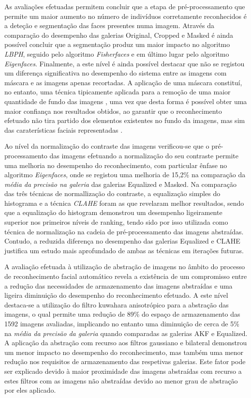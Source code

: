 As avaliações efetuadas permitem concluir que a etapa de pré-processamento que permite um maior aumento no número de indivíduos corretamente reconhecidos é a deteção e segmentação das faces presentes numa imagem. Através da comparação do desempenho das galerias Original, Cropped e Masked é ainda possível concluir que a segmentação produz um maior impacto no algoritmo \textit{LBPH}, seguido pelo algoritmo \textit{Fisherfaces} e em último lugar pelo algoritmo \textit{Eigenfaces}. Finalmente, a este nível é ainda possível destacar que não se registou um diferença significativa no desempenho do sistema entre as imagens com máscara e as imagens apenas recortadas. A aplicação de uma máscara constituí, no entanto, uma técnica tipicamente aplicada para a remoção de uma maior quantidade de fundo das imagens \cite{Phillips2000, ahonen2004face, Kumar2009}, uma vez que desta forma é possível obter uma maior confiança nos resultados obtidos, ao garantir que o reconhecimento efetuado não tira partido dos elementos existentes no fundo da imagens, mas sim das caraterísticas faciais representadas \cite{Kumar2009}.

Ao nível da normalização do contraste das imagens verificou-se que o pré-processamento das imagens efetuando a normalização do seu contraste permite uma melhoria no desempenho do reconhecimento, com particular ênfase no algoritmo \textit{Eigenfaces}, onde se registou uma melhoria de 15,2\% na comparação da \textit{média da precisão na galeria} das galerias Equalized e Masked. Na comparação das três técnicas de normallização do contraste, a equalização simples do histograma e a técnica \textit{CLAHE} foram as que revelaram melhor resultados, sendo que a equalização do histogram demonstrou um desempenho ligeiramente superior nos primeiros níveis de ranking, tendo sido por isso utilizada como técnica de normalização na cadeia de pré-processamento das imagens abstraídas. Contudo, a reduzida diferença no desempenho das galerias Equalized e CLAHE justifica um estudo mais aprofundado de ambas as técnicas em iterações futuras.

A avaliação efetuada à utilização de abstração de imagens no âmbito do processo de reconhecimento facial automático revela a existência de um compromisso entre a redução das necessidades de armazenamento das imagens abstraídas e uma ligeira diminuição do desempenho do reconhecimento efetuado. A este nível destaca-se a utilização do filtro kuwahara anisotrópico para a abstração das imagens, o qual permite uma redução de 89\% do espaço de armazenamento das 1592 imagens avaliadas, implicando no entanto uma diminuição de cerca de 5\% na \textit{média da precisão da galeria} quando comparadas as galerias AKF e Equalized. A aplicação da abstração com recurso aos filtros gaussiano e bilateral demonstrou um menor impacto no desempenho do reconhecimento, mas também uma menor redução nos requisitos de armazenamento das respetivas galerias. Este fator pode ser explicado devido à maior proximidade das imagens abstraídas com recurso a estes filtros com as imagens não abstraídas devido ao menor grau de abstração por eles aplicado.

